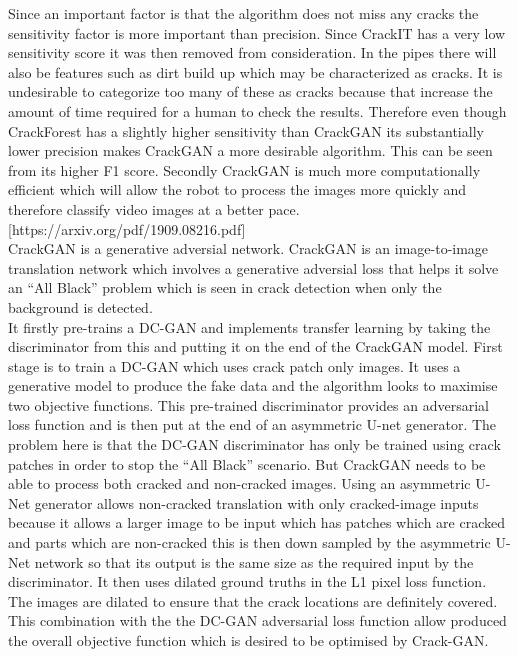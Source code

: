 \documentclass[11pt]{article}		%
\begin{document}
        Since an important factor is that the algorithm does not miss any cracks the sensitivity factor is more important than precision. 
        Since CrackIT has a very low sensitivity score it was then removed from consideration. 
        In the pipes there will also be features such as dirt build up which may be characterized as cracks. 
        It is undesirable to categorize too many of these as cracks because that increase the amount of time required for a human to check the results.
        Therefore even though CrackForest has a slightly higher sensitivity than CrackGAN its substantially lower precision makes CrackGAN a more desirable algorithm. 
        This can be seen from its higher F1 score. %
        Secondly CrackGAN is much more computationally efficient which will allow the robot to process the images more quickly and therefore classify video images at a better pace. [https://arxiv.org/pdf/1909.08216.pdf]
		\\
		CrackGAN is a generative adversial network. 
		CrackGAN is an image-to-image translation network which involves a generative adversial loss that helps it solve an “All Black” problem which is seen in crack detection when only the background is detected.
		\\
		It firstly pre-trains a DC-GAN and implements transfer learning by taking the discriminator from this and putting it on the end of the CrackGAN model.
		First stage is to train a DC-GAN which uses crack patch only images.
		It uses a generative model to produce the fake data and the algorithm looks to maximise two objective functions. 
		This pre-trained discriminator provides an adversarial loss function and is then put at the end of an asymmetric U-net generator. 
		The problem here is that the DC-GAN discriminator has only be trained using crack patches in order to stop the “All Black” scenario. 
		But CrackGAN needs to be able to process both cracked and non-cracked images. 
		Using an asymmetric U-Net generator allows non-cracked translation with only cracked-image inputs because it allows a larger image to be input which has patches which are cracked and parts which are non-cracked this is then down sampled by the asymmetric U-Net network so that its output is the same size as the required input by the discriminator. 
		It then uses dilated ground truths in the L1 pixel loss function. 
		The images are dilated to ensure that the crack locations are definitely covered. 
		This combination with the the DC-GAN adversarial loss function allow produced the overall objective function which is desired to be optimised by Crack-GAN.
		
\end{document}
